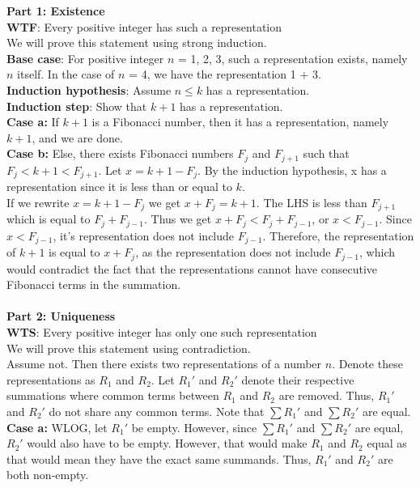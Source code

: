 \documentclass[12pt]{article}
\begin{document}
\textbf{Part 1: Existence}\\
\textbf{WTF}: Every positive integer has such a representation \\
We will prove this statement using strong induction.\\
\textbf{Base case}: For positive integer $n$ = 1, 2, 3, such a representation exists, namely $n$ itself. In the case of $n$ = 4, we have the representation 1 + 3. \\
\textbf{Induction hypothesis}: Assume $n \leq k$ has a representation. \\
\textbf{Induction step}: Show that $k+1$ has a representation. \\
\textbf{Case a:} If $k+1$ is a Fibonacci number, then it has a representation, namely $k+1$, and we are done. \\
\textbf{Case b:} Else, there exists Fibonacci numbers $F_{j}$ and $F_{j+1}$ such that $F_{j} < k+1 < F_{j+1}$. Let $x = k+1 - F_{j}$. By the induction hypothesis, x has a representation since it is less than or equal to $k$.\\
If we rewrite $x = k+1 - F_{j}$ we get $x + F_{j} = k+1$. The LHS is less than $F_{j+1}$ which is equal to $F_{j} + F_{j-1}$. Thus we get $x + F_{j} < F_{j} + F_{j-1}$, or $x < F_{j-1}$. Since $x < F_{j-1}$, it's representation does not include $F_{j-1}$. Therefore, the representation of $k+1$ is equal to $x + F_{j}$, as the representation does not include $F_{j-1}$, which would contradict the fact that the representations cannot have consecutive Fibonacci terms in the summation.
\\\\
\textbf{Part 2: Uniqueness}\\
\textbf{WTS}: Every positive integer has only one such representation \\
We will prove this statement using contradiction. \\
Assume not. Then there exists two representations of a number $n$. Denote these representations as $R_{1}$ and $R_{2}$. Let $R_{1}'$ and $R_{2}'$ denote their respective summations where common terms between $R_{1}$ and $R_{2}$ are removed. Thus, $R_{1}'$ and $R_{2}'$ do not share any common terms. Note that $\sum {R_{1}'}$ and $\sum {R_{2}'}$ are equal. \\
\textbf{Case a:} WLOG, let $R_{1}'$ be empty. However, since $\sum {R_{1}'}$ and $\sum {R_{2}'}$ are equal, $R_{2}'$ would also have to be empty. However, that would make $R_{1}$ and $R_{2}$ equal as that would mean they have the exact same summands. Thus, $R_{1}'$ and $R_{2}'$ are both non-empty.\\
\end{document}
